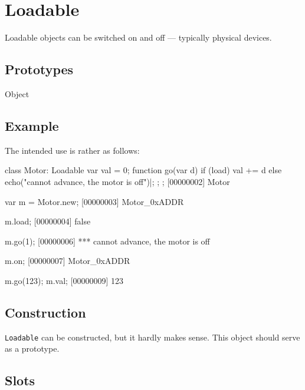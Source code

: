 
\section{Loadable}

Loadable objects can be switched on and off --- typically physical
devices.

\subsection{Prototypes}

\begin{refObjects}
\item[Object]
\end{refObjects}

\subsection{Example}

The intended use is rather as follows:

\begin{urbiscript}
class Motor: Loadable
{
  var val = 0;
  function go(var d)
  {
    if (load)
      val += d
    else
      echo("cannot advance, the motor is off")|;
  };
};
[00000002] Motor

var m = Motor.new;
[00000003] Motor_0xADDR

m.load;
[00000004] false

m.go(1);
[00000006] *** cannot advance, the motor is off

m.on;
[00000007] Motor_0xADDR

m.go(123);
m.val;
[00000009] 123
\end{urbiscript}

\subsection{Construction}

\lstinline|Loadable| can be constructed, but it hardly makes sense.
This object should serve as a prototype.

\subsection{Slots}

